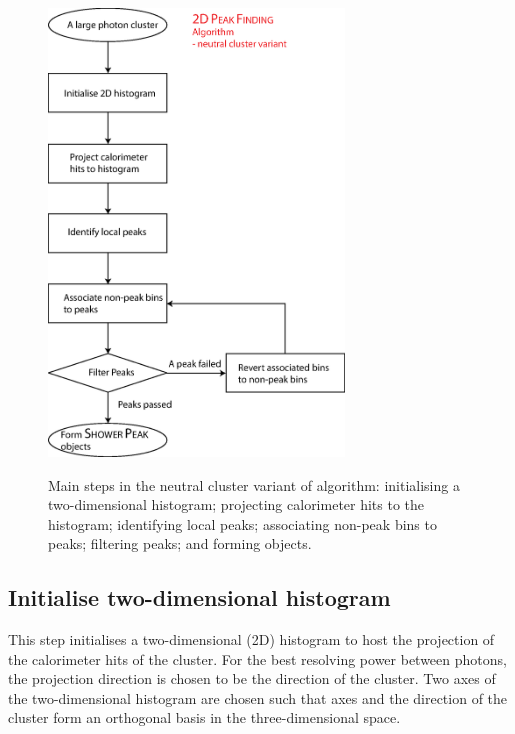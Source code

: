 
\begin{figure}[tbph]
\centering
{\includegraphics[width=0.7\textwidth]{photon/2DpeakFinding2}}
\caption[Flow chart for \peakFinding algorithm neutral cluster variant.]
{Main steps in the  neutral cluster variant of \peakFinding algorithm: initialising a two-dimensional histogram; projecting  calorimeter hits to the histogram; identifying local peaks; associating non-peak bins to peaks; filtering peaks; and forming \ShowerPeak objects.}
\label{fig:photonPeakFindingFlowNeutral}
\end{figure}

\subsection{Initialise  two-dimensional histogram}

This step initialises a two-dimensional (2D) histogram to host the projection of the calorimeter hits of the cluster. For the best resolving power between photons, the projection direction is chosen to be the direction of the cluster. Two axes of the two-dimensional histogram are chosen such that axes and the direction of the cluster form an orthogonal basis  in the three-dimensional space.

